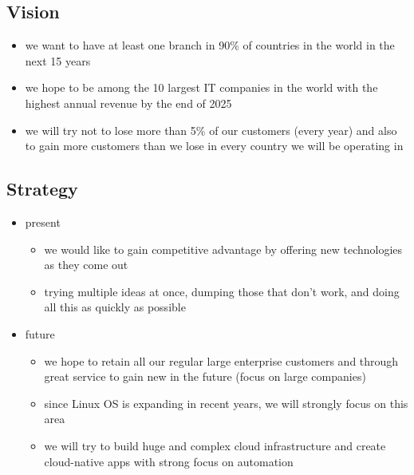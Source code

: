 \documentclass[11pt,a4paper]{article}
\begin{document}
    \subsection{Vision}
    \begin{itemize}
        \item we want to have at least one branch in 90\% of countries in the world in the next 15 years

        \item we hope to be among the 10 largest IT companies in the world with the highest annual revenue by the end of 2025

        \item we will try not to lose more than 5\% of our customers (every year) and also to gain more customers than we lose in every country we will be operating in
    \end{itemize}

    \subsection{Strategy}
    \begin{itemize}

        \item present
        \begin{itemize}
            \item we would like to gain competitive advantage by offering new technologies as they come out

            \item trying multiple ideas at once, dumping those that don't work, and doing all this as quickly as possible
        \end{itemize}

        \item future
        \begin{itemize}
            \item we hope to retain all our regular large enterprise customers and through great service to gain new in the future (focus on large companies)

            \item since Linux OS is expanding in recent years, we will strongly focus on this area

            \item we will try to build huge and complex cloud infrastructure and create cloud-native apps with strong focus on automation
        \end{itemize}
    \end{itemize}
\end{document}
